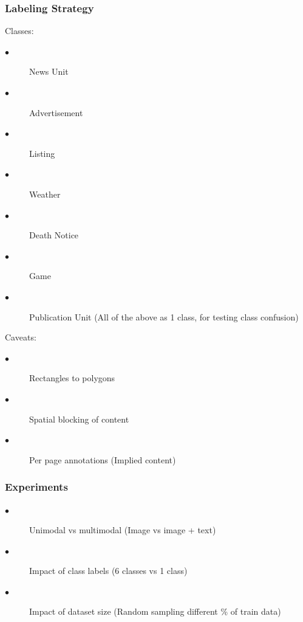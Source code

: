 \documentclass[aspectratio=1610]{beamer}
\begin{document}
\normalpage

\begin{frame}
  \frametitle{Labeling Strategy}

Classes:
\begin{description}
\item[$\bullet$] News Unit
\item[$\bullet$] Advertisement
\item[$\bullet$] Listing
\item[$\bullet$] Weather
\item[$\bullet$] Death Notice
\item[$\bullet$] Game
\item[$\bullet$] Publication Unit (All of the above as 1 class, for testing class confusion)
\end{description}

Caveats:
\begin{description}
\item[$\bullet$] Rectangles to polygons
\item[$\bullet$] Spatial blocking of content
\item[$\bullet$] Per page annotations (Implied content)
\end{description}
\end{frame}
\normalpage


\begin{frame}
  \frametitle{Experiments}

\begin{description}
\item[$\bullet$] Unimodal vs multimodal (Image vs image + text)
\item[$\bullet$] Impact of class labels (6 classes vs 1 class)
\item[$\bullet$] Impact of dataset size (Random sampling different \% of train data)
\end{description}

\end{frame}
\normalpage
\end{document}
